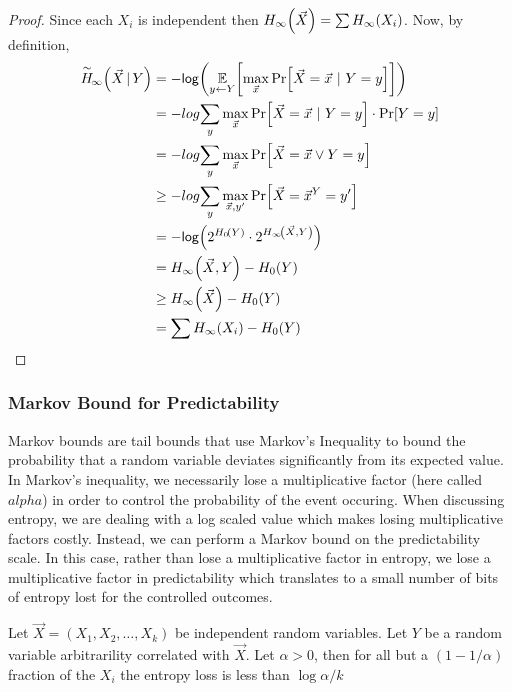 \begin{proof}
    Since each $X_i$ is independent then $H_{\infty}\!\left(\vec{X}\right) = \sum H_{\infty}\!\left(X_i\right)$.
    Now, by definition,
    \begin{align}
        \acminent{\vec{X}}{Y} &= -\log{\Exlim{y \leftarrow Y}{\max\limits_{\vec{x}} \Prob{\Vec{X} = \vec{x}\ |\ Y = y}}} \\
        &= -log{\sum\limits_{y} \max\limits_{\vec{x}} \Prob{\vec{X} = \vec{x} \ |\ Y = y} \cdot \Prob{Y = y}}\\
        &= -log{\sum\limits_{y} \max\limits_{\vec{x}} \Prob{\vec{X} = \vec{x} \vee Y = y}}\\
        &\geq -log{\sum\limits_{y} \max\limits_{\vec{x}, y'} \Prob{\vec{X} = \vec{x}  ^ Y = y'}}\\
        &= -\log{2^{\hart{Y}} \cdot 2^{\minent{\vec{X},Y}}}\\
        &= \minent{\vec{X},Y} - \hart{Y}\\
        &\geq \minent{\vec{X}} - \hart{Y} \\   
        &= \sum \minent{X_i} - \hart{Y}
    \end{align}
\end{proof}

\subsubsection{Markov Bound for Predictability}
Markov bounds are tail bounds that use Markov's Inequality to bound the probability that a random variable deviates significantly from its expected value. In Markov's inequality, we necessarily lose a multiplicative factor (here called $alpha$) in order to control the probability of the event occuring. When discussing entropy, we are dealing with a log scaled value which makes losing multiplicative factors costly. Instead, we can perform a Markov bound on the predictability scale. In this case, rather than lose a multiplicative factor in entropy, we lose a multiplicative factor in predictability which translates to a small number of bits of entropy lost for the controlled outcomes.

\begin{lemma}
    \label{lem:markovpred}
    Let $\vec{X} = (X_1, X_2, \ldots, X_k)$ be independent random variables. Let $Y$ be a random variable arbitrarility correlated with $\vec{X}$. 
    Let $\alpha > 0$, then for all but a $(1-1/\alpha)$ fraction of the $X_i$ the entropy loss is less than $\log{\alpha}/k$
\end{lemma}

